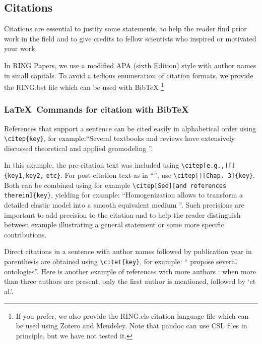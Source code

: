 \documentclass[preprint]{ring}
\begin{document}
\subsection{Citations}

Citations are essential to justify some statements, to help the reader find prior work in the field and to give credits to fellow scientists who inspired or motivated your work. 

In RING Papers, we use a modified APA (sixth Edition) style with author names in small capitals. To avoid a tedious enumeration of citation formats, we provide the RING.bst file which can be used with BibTeX \footnote{If you prefer, we also provide the RING.cls citation language file which can be used using Zotero and Mendeley. Note that pandoc can use CSL files in principle, but we have not tested it.}

\subsubsection{\LaTeX\ Commands for citation with BibTeX}

References that support a sentence can be cited easily in alphabetical order using \verb|\citep{key}|, for example:``Several textbooks and reviews have extensively discussed theoretical and applied geomodeling \citep[e.g.,][]{Mallet2002, Mallet2014, Perrin2013, Ringrose2015, Wellmann2018AG}''. 

In this example, the pre-citation text was included using \verb|\citep[e.g.,][]{key1,key2,| \verb|etc}|. For post-citation text as in ``\citep[chap. 3][]{Mallet2002}'', use \verb|\citep[][Chap. 3]{key}|. Both can be combined using for example \verb|\citep[See][and references therein]{key}|, yielding for example: ``Homogenization allows to transform a detailed elastic model into a smooth equivalent medium \citep[See][and references therein]{Capdeville2020AiG}''. Such precisions are important to add precision to the citation and to help the reader distinguish between example illustrating a general statement or some more specific contributions. 

Direct citations in a sentence with author names followed by publication year in parenthesis are obtained using \verb|\citet{key}|, for example: ``\citet{Perrin2013} propose several ontologies''. 
Here is another example of references with more authors \citep{Collon2017G, Freeman1990FB, Kolditz2012EES}: when more than three authors are present, only the first author is mentioned, followed by `et al.'. 
\end{document}
